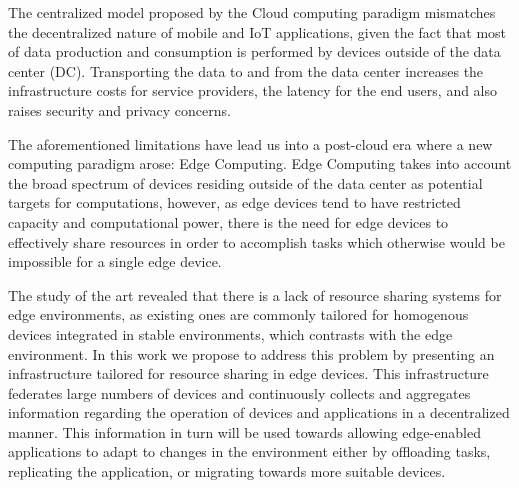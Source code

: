

The centralized model proposed by the Cloud computing paradigm mismatches the decentralized nature of mobile and IoT applications, given the fact that most of data production and consumption is performed by devices outside of the data center (DC). Transporting the data to and from the data center increases the infrastructure costs for service providers, the latency for the end users, and also raises security and privacy concerns. 

The aforementioned limitations have lead us into a post-cloud era where a new computing paradigm arose: Edge Computing. Edge Computing takes into account the broad spectrum of devices residing outside of the data center as potential targets for computations, however, as edge devices tend to have restricted capacity and computational power, there is the need for edge devices to effectively share resources in order to accomplish tasks which otherwise would be impossible for a single edge device. 

The study of the art revealed that there is a lack of resource sharing systems for edge environments, as existing ones are commonly tailored for homogenous devices integrated in stable environments, which contrasts with the edge environment. In this work we propose to address this problem by presenting an infrastructure tailored for resource sharing in edge devices. This infrastructure federates large numbers of devices and continuously collects and aggregates information regarding the operation of devices and applications in a decentralized manner. This information in turn will be used towards allowing edge-enabled applications to adapt to changes in the environment either by offloading tasks, replicating the application, or migrating towards more suitable devices. 